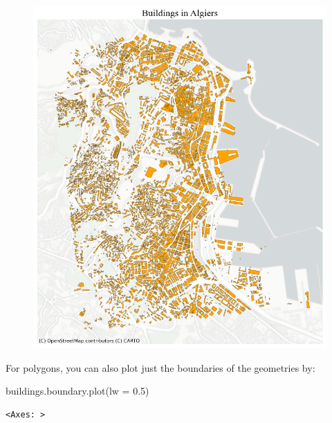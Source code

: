 \documentclass[
  letterpaper,
  DIV=11,
  numbers=noendperiod]{scrreprt}
\newenvironment{Shaded}{\begin{snugshade}}{\end{snugshade}}
\newcommand{\FloatTok}[1]{\textcolor[rgb]{0.68,0.00,0.00}{#1}}
\newcommand{\NormalTok}[1]{\textcolor[rgb]{0.00,0.23,0.31}{#1}}
\newcommand{\OperatorTok}[1]{\textcolor[rgb]{0.37,0.37,0.37}{#1}}
\begin{document}
\begin{figure}[H]

{\centering \includegraphics{labs/w02_maps_files/figure-pdf/cell-16-output-1.png}

}

\end{figure}

For polygons, you can also plot just the boundaries of the geometries
by:

\begin{Shaded}
\begin{Highlighting}[]
\NormalTok{buildings.boundary.plot(lw }\OperatorTok{=} \FloatTok{0.5}\NormalTok{)}
\end{Highlighting}
\end{Shaded}

\begin{verbatim}
<Axes: >
\end{verbatim}
\end{document}
